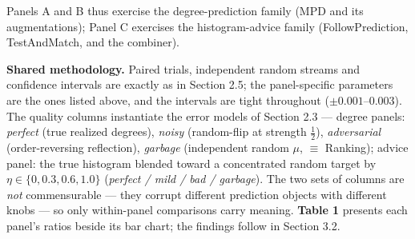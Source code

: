 Panels A and B thus exercise the degree-prediction family (MPD and its
augmentations); Panel C exercises the histogram-advice family
(FollowPrediction, TestAndMatch, and the combiner).

\textbf{Shared methodology.} Paired trials, independent random streams
and confidence intervals are exactly as in Section 2.5; the
panel-specific parameters are the ones listed above, and the intervals
are tight throughout (\(\pm0.001\)--\(0.003\)). The quality columns
instantiate the error models of Section 2.3 --- degree panels:
\emph{perfect} (true realized degrees), \emph{noisy} (random-flip at
strength \(\tfrac12\)), \emph{adversarial} (order-reversing reflection),
\emph{garbage} (independent random \(\mu\), \(\equiv\) Ranking); advice
panel: the true histogram blended toward a concentrated random target by
\(\eta\in\{0,0.3,0.6,1.0\}\) (\emph{perfect / mild / bad / garbage}).
The two sets of columns are \emph{not} commensurable --- they corrupt
different prediction objects with different knobs --- so only
within-panel comparisons carry meaning. \textbf{Table 1} presents each
panel's ratios beside its bar chart; the findings follow in Section 3.2.

